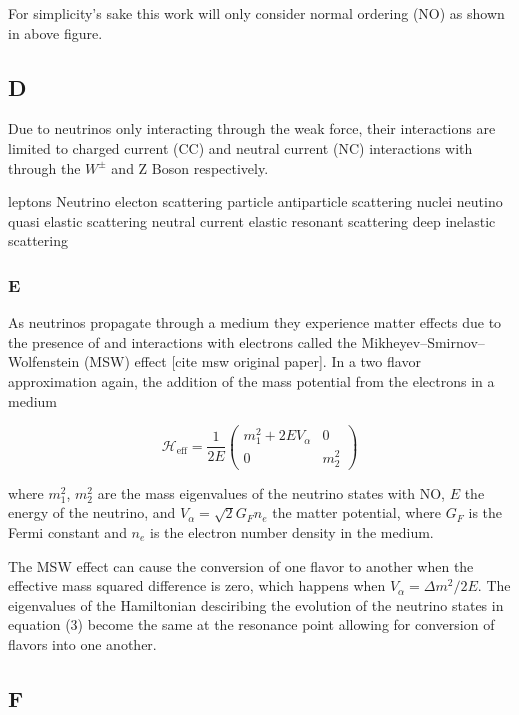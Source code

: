 \documentclass[a4paper,12pt,numbered]{article}
\begin{document}
For simplicity's sake this work will only consider normal ordering (NO) as shown in above figure. 

\subsection{D}

Due to neutrinos only interacting through the weak force, their interactions are limited to charged current (CC) and neutral current (NC) interactions with through the $W^{\pm}$ and Z Boson respectively.

leptons
Neutrino electon scattering
particle antiparticle scattering
nuclei
neutino quasi elastic scattering
neutral current elastic
resonant scattering
deep inelastic scattering

\subsubsection{E}

As neutrinos propagate through a medium they experience matter effects due to the presence of and interactions with electrons called the Mikheyev–Smirnov–Wolfenstein (MSW) effect [cite msw original paper]. In a two flavor approximation again, the addition of the mass potential from the electrons in a medium 

\begin{equation}
\mathcal{H}_\text{eff} = \frac{1}{2E} \begin{pmatrix} 
m_1^2 + 2 E V_\alpha & 0 \\
0 & m_2^2
\end{pmatrix}
\end{equation}

where $m_1^2$, $m_2^2$ are the mass eigenvalues of the neutrino states with NO, $E$ the energy of the neutrino, and $V_\alpha = \sqrt{2} G_F n_e$ the matter potential, where $G_F$ is the Fermi constant and $n_e$ is the electron number density in the medium.

The MSW effect can cause the conversion of one flavor to another when the effective mass squared difference is zero, which happens when $V_\alpha = \Delta m^2/2E$. The eigenvalues of the Hamiltonian desciribing the evolution of the neutrino states in equation (3) become the same at the resonance point allowing for conversion of flavors into one another.

\subsection{F}
\end{document}
